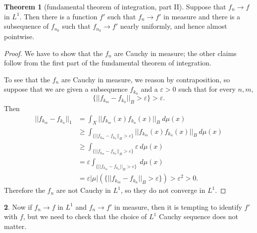 \documentclass[12pt]{book}
\theoremstyle{definition}
\newtheorem{theorem}{Theorem}[section]
\newtheorem{subsec}[theorem]{}
\begin{document}
\begin{theorem}[fundamental theorem of integration, part II]
Suppose that $f_n \to f$ in $L^1$. Then there is a function $f'$ such that $f_n \to f'$ in measure and there is a subsequence of $f_{n_k}$ such that $f_{n_k} \to f'$ nearly uniformly, and hence almost pointwise.
\end{theorem}
\begin{proof}
We have to show that the $f_n$ are Cauchy in measure; the other claims follow from the first part of the fundamental theorem of integration.

To see that the $f_n$ are Cauchy in measure, we reason by contraposition, so suppose that we are given a subsequence $f_{k_n}$ and a $\varepsilon > 0$ such that for every $n,m$,
$$\{||f_{k_m} - f_{k_n}||_B > \varepsilon\} > \varepsilon.$$
Then
\begin{align*}
||f_{k_m} - f_{k_n}||_1 &= \int_X ||f_{k_m}(x) f_{k_n}(x)||_B~d\mu(x)\\
&\geq \int_{\{||f_{k_m} - f_{k_n}||_B > \varepsilon\}} ||f_{k_m}(x) f_{k_n}(x)||_B~d\mu(x)\\
&\geq \int_{\{||f_{k_m} - f_{k_n}||_B > \varepsilon\}} \varepsilon ~d\mu(x)\\
&= \varepsilon \int_{\{||f_{k_m} - f_{k_n}||_B > \varepsilon\}} ~d\mu(x)\\
&= \varepsilon |\mu|(\{||f_{k_m} - f_{k_n}||_B > \varepsilon\}) > \varepsilon^2 > 0.
\end{align*}
Therefore the $f_n$ are not Cauchy in $L^1$, so they do not converge in $L^1$.
\end{proof}

\begin{subsec}
Now if $f_n \to f$ in $L^1$ and $f_n \to f'$ in measure, then it is tempting to identify $f'$ with $f$, but we need to check that the choice of $L^1$ Cauchy sequence does not matter.
\end{subsec}
\end{document}
